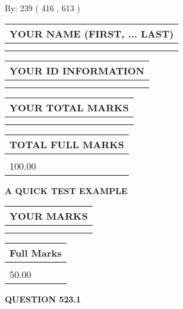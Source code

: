 \documentclass[12pt]{article}
\begin{document}
   
\hspace{1.0in} By: 
 239 ( 416 ,  613 )
   
   
   
   
\newpage 
\setcounter{page}{ 
   523001 } 
   
   
   
   
\noindent\begin{tabular}{|l|}
\hline
YOUR NAME (FIRST, ... LAST)  \\
\hline
 \\ 
 \\ 
\hline
\end{tabular}
\hspace{0.05in} \begin{tabular}{|l|}
\hline
 YOUR   ID   INFORMATION  \\
\hline
 \\ 
 \\ 
\hline
\end{tabular}
   
   
\vspace{0.2in}\noindent\begin{tabular}{|l|}
\hline
YOUR TOTAL MARKS  \\
\hline
 \\ 
 \\ 
\hline
\end{tabular}
\hspace{0.05in} \begin{tabular}{|l|}
\hline
TOTAL FULL MARKS  \\
\hline
 \\ 
100.00 \\
\hline
\end{tabular}
   
   
 \vspace{0.2in}
{\LARGE {\textbf{ A QUICK TEST EXAMPLE}}}
   
   
  
\vspace{0.2in}
  
\noindent\begin{tabular}{|l|}
\hline
 YOUR MARKS  \\
\hline
 \\ 
 \\ 
\hline
\end{tabular}
\hspace{0.05in} \begin{tabular}{|l|}
\hline
 Full Marks  \\
\hline
 \\ 
50.00 \\
\hline
\end{tabular}
{\textbf{\Large{QUESTION
523.1 
}}}
  
\end{document}
